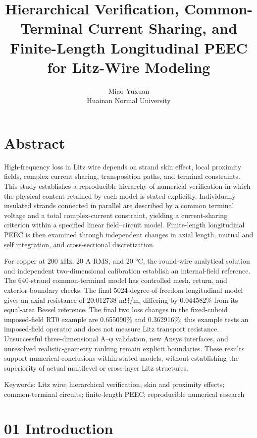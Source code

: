 \documentclass[11pt]{article}
\begin{document}
\title{Hierarchical Verification, Common-Terminal Current Sharing, and Finite-Length Longitudinal PEEC for Litz-Wire Modeling}
\author{Miao Yuxuan\\Huainan Normal University}
\date{}
\maketitle
\FloatBarrier
\section*{Abstract}
\hypertarget{abstract}{}
High-frequency loss in Litz wire depends on strand skin effect, local proximity fields, complex current sharing, transposition paths, and terminal constraints. This study establishes a reproducible hierarchy of numerical verification in which the physical content retained by each model is stated explicitly. Individually insulated strands connected in parallel are described by a common terminal voltage and a total complex-current constraint, yielding a current-sharing criterion within a specified linear field–circuit model. Finite-length longitudinal PEEC is then examined through independent changes in axial length, mutual and self integration, and cross-sectional discretization.

For copper at 200 kHz, 20 A RMS, and 20 °C, the round-wire analytical solution and independent two-dimensional calibration establish an internal-field reference. The 640-strand common-terminal model has controlled mesh, return, and exterior-boundary checks. The final 5024-degree-of-freedom longitudinal model gives an axial resistance of 20.012738 mΩ/m, differing by 0.044582\% from its equal-area Bessel reference. The final two loss changes in the fixed-cuboid imposed-field RT0 example are 0.655090\% and 0.362916\%; this example tests an imposed-field operator and does not measure Litz transport resistance. Unsuccessful three-dimensional A–φ validation, new Ansys interfaces, and unresolved realistic-geometry ranking remain explicit boundaries. These results support numerical conclusions within stated models, without establishing the superiority of actual multilevel or cross-layer Litz structures.


Keywords: Litz wire; hierarchical verification; skin and proximity effects; common-terminal circuits; finite-length PEEC; reproducible numerical research


\FloatBarrier
\section*{01 Introduction}
\hypertarget{chapter-01}{}
\end{document}
